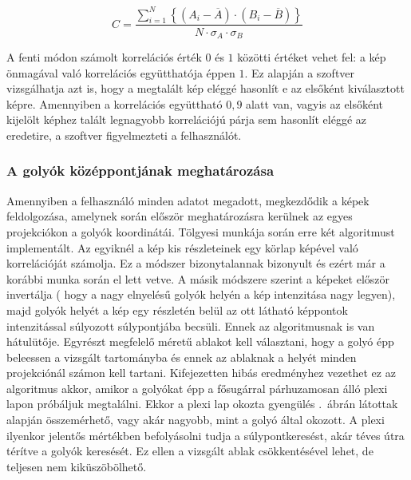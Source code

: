 \documentclass[a4paper,12pt]{article}
\begin{document}
\begin{equation}
\label{eq:corr}
C = \frac{ \sum_{i=1}^{N}  \left \{ (A_i  - \overline{A} ) \cdot ( B_i - \overline{B} ) \right \} }{N \cdot \sigma_A  \cdot \sigma_B}
\end{equation}


A fenti módon számolt korrelációs érték $0$ és $1$ közötti értéket vehet fel: a kép önmagával való korrelációs együtthatója éppen $1$. Ez alapján a szoftver vizsgálhatja azt is, hogy a megtalált kép eléggé hasonlít e az elsőként kiválasztott képre. Amennyiben a korrelációs együttható $0,\!9$ alatt van, vagyis az elsőként kijelölt képhez talált legnagyobb korrelációjú párja sem hasonlít eléggé az eredetire, a szoftver figyelmezteti a felhasználót.



\subsubsection{A golyók középpontjának meghatározása}
\label{sec:kozeppont}



Amennyiben a felhasználó minden adatot megadott, megkezdődik a képek feldolgozása, amelynek során először meghatározásra kerülnek az egyes projekciókon a golyók koordinátái. Tölgyesi\cite{botond} munkája során erre két algoritmust implementált. Az egyiknél a kép kis részleteinek egy körlap képével való korrelációját számolja. Ez a módszer bizonytalannak bizonyult és ezért már a korábbi munka során el lett vetve. A másik módszere szerint a képeket először invertálja ( hogy a nagy elnyelésű golyók helyén a kép intenzitása nagy legyen), majd golyók helyét a kép egy részletén belül az ott látható képpontok intenzitással súlyozott súlypontjába becsüli.  Ennek az algoritmusnak is van hátulütője. Egyrészt megfelelő méretű ablakot kell választani, hogy a golyó épp beleessen a vizsgált tartományba és ennek az ablaknak a helyét minden projekciónál számon kell tartani. Kifejezetten hibás eredményhez vezethet ez az algoritmus akkor, amikor a golyókat épp a fősugárral párhuzamosan álló plexi lapon próbáljuk megtalálni. Ekkor a plexi lap okozta gyengülés .~ábrán látottak alapján összemérhető, vagy akár nagyobb, mint a golyó által okozott. A plexi ilyenkor jelentős mértékben befolyásolni tudja a súlypontkeresést, akár téves útra térítve a golyók keresését. Ez ellen a vizsgált ablak csökkentésével lehet, de teljesen nem kiküszöbölhető.
\end{document}
